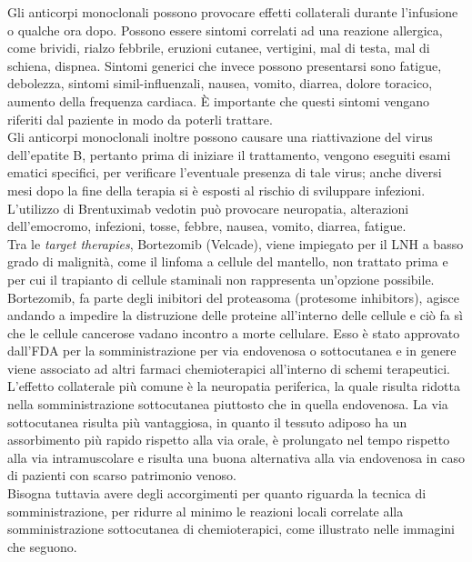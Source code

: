 Gli anticorpi monoclonali possono provocare effetti collaterali durante l’infusione o qualche ora dopo. 
Possono essere sintomi correlati ad una reazione allergica, come brividi, 
rialzo febbrile, eruzioni cutanee, vertigini, mal di testa, mal di schiena, dispnea. 
Sintomi generici che invece possono presentarsi sono fatigue, debolezza, sintomi simil-influenzali, nausea, vomito, 
diarrea, dolore toracico, aumento della frequenza cardiaca\cite{LLSIMMUNO}.
È importante che questi sintomi vengano riferiti dal paziente in modo da poterli trattare.\\		
Gli anticorpi monoclonali inoltre possono causare una riattivazione del virus dell’epatite B, pertanto prima di iniziare 
il trattamento, vengono eseguiti esami ematici specifici, 
per verificare l’eventuale presenza di tale virus; anche diversi mesi dopo la fine della terapia
si è esposti al rischio di sviluppare infezioni. 
L’utilizzo di Brentuximab vedotin può provocare neuropatia, alterazioni  dell’emocromo, infezioni, tosse, febbre, 
nausea, vomito, diarrea, fatigue\cite{IMMUNOTP}.\\

Tra le \emph{target therapies}, Bortezomib (Velcade), viene impiegato per il LNH a basso grado di malignità, 
come il linfoma a cellule del mantello, non trattato prima e per cui il trapianto di cellule staminali 
non rappresenta un'opzione possibile.\\
Bortezomib, fa parte degli inibitori del proteasoma (protesome inhibitors), agisce andando a impedire la distruzione 
delle proteine all’interno delle cellule e ciò fa sì che le cellule cancerose vadano incontro a 
morte cellulare\cite{LOWGRADE}.
Esso è stato approvato dall’FDA per la somministrazione per via endovenosa o sottocutanea e in genere viene associato 
ad altri farmaci chemioterapici all’interno di schemi terapeutici.\\ 
L’effetto collaterale più comune è la neuropatia periferica, 
la quale risulta ridotta nella somministrazione sottocutanea piuttosto che in quella endovenosa. 
La via sottocutanea risulta più vantaggiosa, in quanto il tessuto adiposo ha un assorbimento più rapido rispetto 
alla via orale, è prolungato nel tempo rispetto alla via intramuscolare e 
risulta una buona alternativa alla via endovenosa in caso di pazienti con scarso patrimonio venoso\cite{BORTEZOMIB}.\\
Bisogna tuttavia avere degli accorgimenti per quanto riguarda la tecnica di somministrazione, per ridurre al minimo 
le reazioni locali correlate alla somministrazione sottocutanea di chemioterapici, 
come illustrato nelle immagini che seguono.

